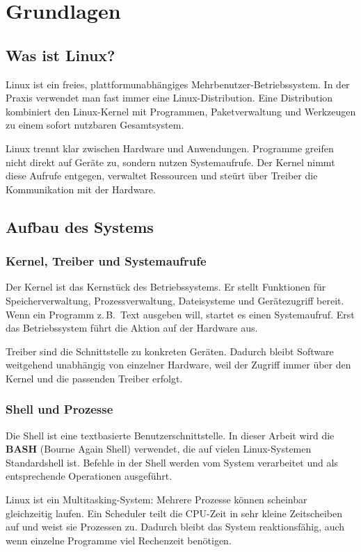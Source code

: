 \documentclass[11pt, oneside, numbers=nönddot]{scrbook}
\begin{document}

\tableofcontents
{}		



\chapter{Grundlagen}

\section{Was ist Linux?}
Linux ist ein freies, plattformunabhängiges Mehrbenutzer-Betriebssystem. In der Praxis verwendet man fast immer eine Linux-Distribution. Eine Distribution kombiniert den Linux-Kernel mit Programmen, Paketverwaltung und Werkzeugen zu einem sofort nutzbaren Gesamtsystem.

Linux trennt klar zwischen Hardware und Anwendungen. Programme greifen nicht direkt auf Geräte zu, sondern nutzen Systemaufrufe. Der Kernel nimmt diese Aufrufe entgegen, verwaltet Ressourcen und steürt über Treiber die Kommunikation mit der Hardware.

\section{Aufbau des Systems}
\subsection{Kernel, Treiber und Systemaufrufe}
Der Kernel ist das Kernstück des Betriebssystems. Er stellt Funktionen für Speicherverwaltung, Prozessverwaltung, Dateisysteme und Gerätezugriff bereit. Wenn ein Programm z.\,B.\ Text ausgeben will, startet es einen Systemaufruf. Erst das Betriebssystem führt die Aktion auf der Hardware aus.

Treiber sind die Schnittstelle zu konkreten Geräten. Dadurch bleibt Software weitgehend unabhängig von einzelner Hardware, weil der Zugriff immer über den Kernel und die passenden Treiber erfolgt.
\newpage
\subsection{Shell und Prozesse}
Die Shell ist eine textbasierte Benutzerschnittstelle. In dieser Arbeit wird die \textbf{BASH} (Bourne Again Shell) verwendet, die auf vielen Linux-Systemen Standardshell ist. Befehle in der Shell werden vom System verarbeitet und als entsprechende Operationen ausgeführt.

Linux ist ein Multitasking-System: Mehrere Prozesse können scheinbar gleichzeitig laufen. Ein Scheduler teilt die CPU-Zeit in sehr kleine Zeitscheiben auf und weist sie Prozessen zu. Dadurch bleibt das System reaktionsfähig, auch wenn einzelne Programme viel Rechenzeit benötigen.
\end{document}
